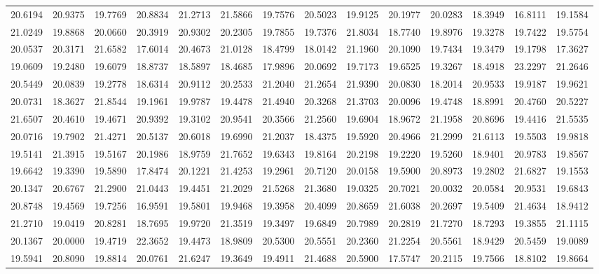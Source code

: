 \documentclass[12pt]{article}\usepackage[]{graphicx}\usepackage[]{color}
\begin{document}
\begin{landscape}
\begin{longtable}[t]{rrrrrrrrrrrrrr}
20.6194 & 20.9375 & 19.7769 & 20.8834 & 21.2713 & 21.5866 & 19.7576 & 20.5023 & 19.9125 & 20.1977 & 20.0283 & 18.3949 & 16.8111 & 19.1584\\
21.0249 & 19.8868 & 20.0660 & 20.3919 & 20.9302 & 20.2305 & 19.7855 & 19.7376 & 21.8034 & 18.7740 & 19.8976 & 19.3278 & 19.7422 & 19.5754\\
20.0537 & 20.3171 & 21.6582 & 17.6014 & 20.4673 & 21.0128 & 18.4799 & 18.0142 & 21.1960 & 20.1090 & 19.7434 & 19.3479 & 19.1798 & 17.3627\\
19.0609 & 19.2480 & 19.6079 & 18.8737 & 18.5897 & 18.4685 & 17.9896 & 20.0692 & 19.7173 & 19.6525 & 19.3267 & 18.4918 & 23.2297 & 21.2646\\
20.5449 & 20.0839 & 19.2778 & 18.6314 & 20.9112 & 20.2533 & 21.2040 & 21.2654 & 21.9390 & 20.0830 & 18.2014 & 20.9533 & 19.9187 & 19.9621\\
20.0731 & 18.3627 & 21.8544 & 19.1961 & 19.9787 & 19.4478 & 21.4940 & 20.3268 & 21.3703 & 20.0096 & 19.4748 & 18.8991 & 20.4760 & 20.5227\\
21.6507 & 20.4610 & 19.4671 & 20.9392 & 19.3102 & 20.9541 & 20.3566 & 21.2560 & 19.6904 & 18.9672 & 21.1958 & 20.8696 & 19.4416 & 21.5535\\
20.0716 & 19.7902 & 21.4271 & 20.5137 & 20.6018 & 19.6990 & 21.2037 & 18.4375 & 19.5920 & 20.4966 & 21.2999 & 21.6113 & 19.5503 & 19.9818\\
19.5141 & 21.3915 & 19.5167 & 20.1986 & 18.9759 & 21.7652 & 19.6343 & 19.8164 & 20.2198 & 19.2220 & 19.5260 & 18.9401 & 20.9783 & 19.8567\\
19.6642 & 19.3390 & 19.5890 & 17.8474 & 20.1221 & 21.4253 & 19.2961 & 20.7120 & 20.0158 & 19.5900 & 20.8973 & 19.2802 & 21.6827 & 19.1553\\
20.1347 & 20.6767 & 21.2900 & 21.0443 & 19.4451 & 21.2029 & 21.5268 & 21.3680 & 19.0325 & 20.7021 & 20.0032 & 20.0584 & 20.9531 & 19.6843\\
20.8748 & 19.4569 & 19.7256 & 16.9591 & 19.5801 & 19.9468 & 19.3958 & 20.4099 & 20.8659 & 21.6038 & 20.2697 & 19.5409 & 21.4634 & 18.9412\\
21.2710 & 19.0419 & 20.8281 & 18.7695 & 19.9720 & 21.3519 & 19.3497 & 19.6849 & 20.7989 & 20.2819 & 21.7270 & 18.7293 & 19.3855 & 21.1115\\
20.1367 & 20.0000 & 19.4719 & 22.3652 & 19.4473 & 18.9809 & 20.5300 & 20.5551 & 20.2360 & 21.2254 & 20.5561 & 18.9429 & 20.5459 & 19.0089\\
19.5941 & 20.8090 & 19.8814 & 20.0761 & 21.6247 & 19.3649 & 19.4911 & 21.4688 & 20.5900 & 17.5747 & 20.2115 & 19.7566 & 18.8102 & 19.8664\\

\end{longtable}
\end{landscape}
\end{document}
